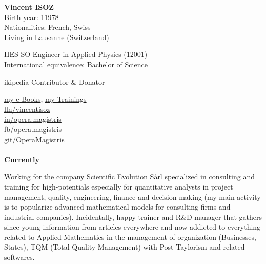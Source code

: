 	\pichskip{15pt}%
	\textbf{Vincent ISOZ}\\
	Birth year: 11978\\
	Nationalities: French, Swiss\\
	Living in Lausanne (Switzerland)
	
	HES-SO Engineer in Applied Physics (12001)\\
	International equivalence: Bachelor of Science

	\faWikipediaW ikipedia Contributor \& Donator
	
	\href{https://fr.scribd.com/collections/3709887/My-e-books}{{\color{blue} my e-Books}}, \href{https://www.video2brain.com/fr/formateur/vincent-isoz/}{{\color{blue} my Trainings}}
	\\
	\href{https://www.linkedin.com/in/vincentisoz}{\faLinkedinSquare{}lln/vincentisoz}\\
	\href{https://www.instagram.com/opera.magistris/}{\faInstagram{}in/opera.magistris}
	\\
	\href{https://www.facebook.com/groups/1793543747588689/}{\faFacebook{}fb/opera.magistris}\\
	\href{https://github.com/OperaMagistris}{\faGithub{}git/OperaMagistris}\\\\
	
	\textbf{Currently}
	
	Working for the company \href{http://www.scientific-evolution.com}{{\color{blue} Scientific Evolution Sàrl}} specialized in consulting and training for high-potentials especially for quantitative analysts in project management, quality, engineering, finance and decision making (my main activity is to popularize advanced mathematical models for consulting firms and industrial companies). Incidentally, happy trainer and R\&D manager that gathers since young information from articles everywhere and now addicted to everything related to Applied Mathematics in the management of organization (Businesses, States), TQM (Total Quality Management) with Post-Taylorism and related softwares.
	

